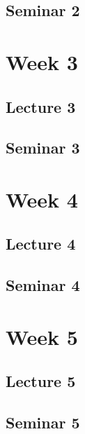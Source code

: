 \documentclass[
]{article}
\begin{document}
\hypertarget{seminar-2}{%
\subsection{Seminar 2}\label{seminar-2}}

\hypertarget{Chapter-4}{%
\section{Week 3}\label{Chapter-4}}

\hypertarget{lecture-3}{%
\subsection{Lecture 3}\label{lecture-3}}

\hypertarget{seminar-3}{%
\subsection{Seminar 3}\label{seminar-3}}

\hypertarget{Chapter-5}{%
\section{Week 4}\label{Chapter-5}}

\hypertarget{lecture-4}{%
\subsection{Lecture 4}\label{lecture-4}}

\hypertarget{seminar-4}{%
\subsection{Seminar 4}\label{seminar-4}}

\hypertarget{Chapter-6}{%
\section{Week 5}\label{Chapter-6}}

\hypertarget{lecture-5}{%
\subsection{Lecture 5}\label{lecture-5}}

\hypertarget{seminar-5}{%
\subsection{Seminar 5}\label{seminar-5}}
\end{document}
